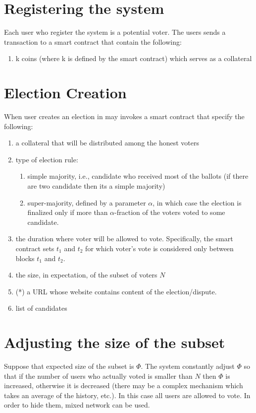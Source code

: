 \documentclass[]{article}
\begin{document}
\section{Registering the system}
Each user who register the system is a potential voter. The users sends a transaction to a smart contract that contain the following:
\begin{enumerate}
\item k coins (where k is defined by the smart contract) which serves as a collateral
\end{enumerate}
\section{Election Creation}
When user creates an election in may invokes a smart contract that specify the following:
\begin{enumerate}
	\item a collateral that will be distributed among the honest voters
	\item type of election rule: 
	\begin{enumerate}
		\item simple majority, i.e., candidate who received most of the ballots (if there are two candidate then its a simple majority)
		\item  super-majority, defined by a parameter $\alpha$, in which case  the election is finalized only if  more than $\alpha$-fraction of the voters voted to some candidate.
	\end{enumerate}
	\item the duration where voter will be allowed to vote. Specifically, the smart contract sets $t_1$ and $t_2$ for which voter's vote is considered only between blocks $t_1$ and $t_2$.  
	\item the size, in expectation, of the subset of voters $N$ 
	\item (*) a URL whose website contains content of the election/dispute. 
	\item list of candidates
\end{enumerate}						
\section{Adjusting the size of the subset}
Suppose that expected size of the subset is $\Phi$. The system constantly adjust $\Phi$ so that if the number of users who actually voted is smaller than $N$ then $\Phi$ is increased, otherwise it is decreased (there may be a complex mechanism which takes an average of the history, etc.).
In this case all users are allowed to vote. In order to hide them, mixed network can be used.											
\end{document}
